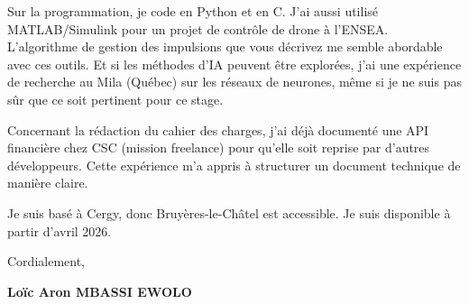 \documentclass[a4paper,11pt]{article}
\begin{document}
\vspace{0.25cm}

Sur la programmation, je code en Python et en C. J'ai aussi utilisé MATLAB/Simulink pour un projet de contrôle de drone à l'ENSEA. L'algorithme de gestion des impulsions que vous décrivez me semble abordable avec ces outils. Et si les méthodes d'IA peuvent être explorées, j'ai une expérience de recherche au Mila (Québec) sur les réseaux de neurones, même si je ne suis pas sûr que ce soit pertinent pour ce stage.

\vspace{0.25cm}

Concernant la rédaction du cahier des charges, j'ai déjà documenté une API financière chez CSC (mission freelance) pour qu'elle soit reprise par d'autres développeurs. Cette expérience m'a appris à structurer un document technique de manière claire.

\vspace{0.25cm}

Je suis basé à Cergy, donc Bruyères-le-Châtel est accessible. Je suis disponible à partir d'avril 2026.

\vspace{0.4cm}

Cordialement,

\vspace{0.8cm}

\textbf{Loïc Aron MBASSI EWOLO}
\end{document}
